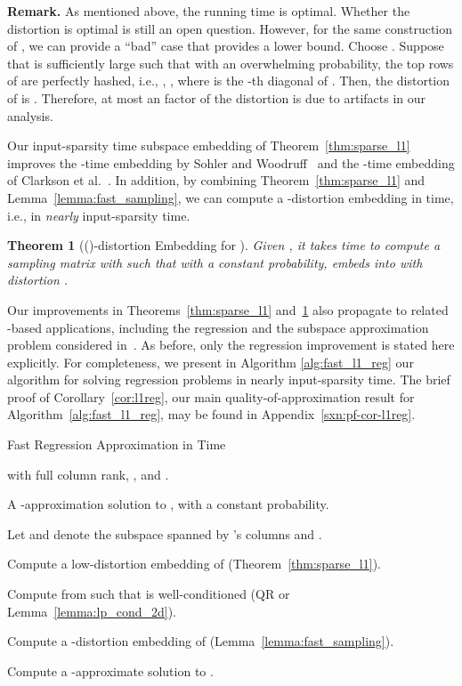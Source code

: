 \documentclass[11pt]{article}
\newtheorem{theorem}{Theorem}
\begin{document}
\noindent
\textbf{Remark.} 
As mentioned above, the  running time is optimal.
Whether the distortion  is optimal is still an open
question. 
However, for the same construction of , we can provide a ``bad'' case that
provides a lower bound.
Choose .
Suppose that  is sufficiently large such that with an overwhelming
probability, the top  rows of  are perfectly hashed, i.e., , , where  is the -th
diagonal of .
Then, the distortion of  is . 
Therefore, at most an  factor of the distortion is due to
artifacts in our analysis.

Our input-sparsity time  subspace embedding of
Theorem~\ref{thm:sparse_l1} improves the -time
embedding by Sohler and Woodruff~\cite{SW11} and the -time 
embedding of Clarkson et al.~\cite{CDMMMW13_SODA}.
In addition, by combining Theorem~\ref{thm:sparse_l1} and
Lemma~\ref{lemma:fast_sampling}, we can compute a -distortion
embedding in  time, i.e., in \emph{nearly} 
input-sparsity time.

\begin{theorem}[()-distortion Embedding for ]
  \label{thm:sparse_l1-eps}
  Given , it takes  time to
  compute a sampling matrix  with  such that with a constant probability, 
  embeds  into  with distortion .
\end{theorem}

Our improvements in Theorems~\ref{thm:sparse_l1} and~\ref{thm:sparse_l1-eps}
also propagate to related -based applications, including the 
regression and the  subspace approximation problem considered
in~\cite{SW11,CDMMMW13_SODA}.
As before, only the regression improvement is stated here explicitly.
For completeness, we present in Algorithm \ref{alg:fast_l1_reg} our algorithm
for solving  regression problems in nearly input-sparsity time.
The brief proof of Corollary~\ref{cor:l1reg}, our main quality-of-approximation
result for Algorithm~\ref{alg:fast_l1_reg}, may be found in
Appendix~\ref{sxn:pf-cor-l1reg}.

\begin{algorithm}
  \caption{Fast  Regression Approximation in  Time}
  \label{alg:fast_l1_reg}
  \begin{algorithmic}[1]
    \Require  with full column rank, , and
    .  

    \Ensure A -approximation solution  to , with a constant probability.

    \State Let  and denote  the  subspace spanned by
    's columns and .
    
    \State Compute a low-distortion embedding  of  (Theorem~\ref{thm:sparse_l1}).
    
    \State Compute  from  such
    that  is well-conditioned (QR or
    Lemma~\ref{lemma:lp_cond_2d}).

    \State Compute a -distortion embedding  of 
    (Lemma~\ref{lemma:fast_sampling}).

    \State Compute a -approximate solution  to .
  \end{algorithmic}
\end{algorithm}
\end{document}
